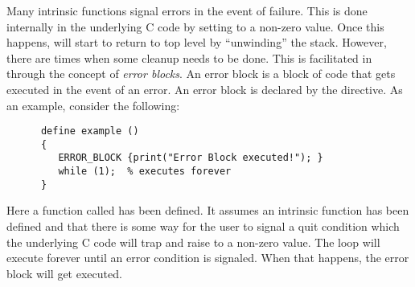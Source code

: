    Many intrinsic functions signal errors in the event of failure.  This is
   done internally in the underlying C code by setting  to
   a non-zero value.  Once this happens, \slang{} will start to return to
   top level by ``unwinding'' the stack. However, there are times when some
   cleanup needs to be done. This is facilitated in \slang{} through the
   concept of {\em error blocks}. An error block is a block of code that
   gets executed in the event of an error.  An error block is declared by
   the  directive.  As an example, consider the following:
\begin{verbatim}
      define example ()
      {
         ERROR_BLOCK {print("Error Block executed!"); }
         while (1);  % executes forever
      }
\end{verbatim}
   Here a function called  has been defined.  It assumes an
   intrinsic function  has been defined and that there is some
   way for the user to signal a quit condition which the underlying C code
   will trap and raise  to a non-zero value.  The
    loop will execute forever until an error condition is
   signaled.  When that happens, the error block will get executed.

